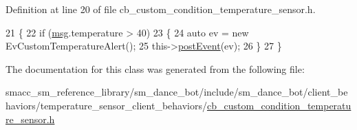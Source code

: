 Definition at line 20 of file cb\+\_\+custom\+\_\+condition\+\_\+temperature\+\_\+sensor.\+h.


\begin{DoxyCode}
21   \{
22     \textcolor{keywordflow}{if} (\hyperlink{namespacekeyboard__node_a768777e12f75b89e4a0a60acf748e9eb}{msg}.temperature > 40)
23     \{
24       \textcolor{keyword}{auto} ev = \textcolor{keyword}{new} EvCustomTemperatureAlert();
25       this->\hyperlink{classsmacc_1_1SmaccClientBehavior_ab29b23145ea074ad69340fc0af6fbb75}{postEvent}(ev);
26     \}
27   \}
\end{DoxyCode}


The documentation for this class was generated from the following file\+:\begin{DoxyCompactItemize}
\item 
smacc\+\_\+sm\+\_\+reference\+\_\+library/sm\+\_\+dance\+\_\+bot/include/sm\+\_\+dance\+\_\+bot/client\+\_\+behaviors/temperature\+\_\+sensor\+\_\+client\+\_\+behaviors/\hyperlink{cb__custom__condition__temperature__sensor_8h}{cb\+\_\+custom\+\_\+condition\+\_\+temperature\+\_\+sensor.\+h}\end{DoxyCompactItemize}
